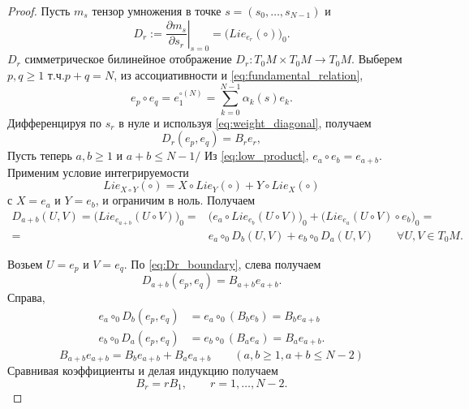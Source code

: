 \documentclass[a4paper, 10pt]{article}
\theoremstyle{plain}
\newcommand\Lie{Lie}
\begin{document}
	\begin{proof}
		Пусть $m_s$ тензор умножения в точке $s=(s_0,\ldots,s_{N-1})$ и
		\[D_r:=\left.\frac{\partial m_s}{\partial s_r}\right|_{s=0}=\bigl(\Lie_{e_r}(\circ)\bigr)_0.\]
		$D_r$ симметрическое билинейное отображение \(D_r:T_0M\times T_0M\longrightarrow T_0M.\)
		Выберем $p,q\ge 1$ т.ч.\(p+q=N\), из ассоциативности и \eqref{eq:fundamental_relation},
		\[e_p\circ e_q=e_1^{\circ(N)}
		=
		\sum_{k=0}^{N-1}\alpha_k(s)e_k.\]
		Дифференцируя по $s_r$ в нуле и используя  \eqref{eq:weight_diagonal}, получаем
		\begin{equation}
			D_r(e_p,e_q)=B_r e_r,
			\label{eq:Dr_boundary}
		\end{equation}
		Пусть теперь $a,b\ge1$ и $a+b\le N-1/$ Из \eqref{eq:low_product},
		\(e_a\circ e_b=e_{a+b}.\)
		Применим условие интегрируемости
		\[\Lie_{X\circ Y}(\circ)
		=
		X\circ\Lie_Y(\circ)+Y\circ\Lie_X(\circ)\]
		с $X=e_a$ и $Y=e_b$, и ограничим в ноль. Получаем
		\begin{equation}
			\begin{aligned}
				D_{a+b}(U,V) = \bigl(\Lie_{e_{a+b}}(U\circ V)\bigr)_0
				=&
				\bigl(e_a \circ \Lie_{e_b}(U\circ V)\bigr)_0 + \bigl(\Lie_{e_a}(U\circ V) \circ e_b\bigr)_0
				=\\=&
				e_a\circ_0D_b(U,V)
				+e_b\circ_0D_a(U,V)
				\label{eq:HM_linearized} 
				\qquad \forall U,V\in T_0M.
			\end{aligned}
		\end{equation}
		
		Возьем $U=e_p$ и $V=e_q$. По \eqref{eq:Dr_boundary}, слева получаем
		\[
		D_{a+b}(e_p,e_q)
		=B_{a+b}e_{a+b}.
		\]
		Справа,
		\begin{align*}
			e_a\circ_0D_b(e_p,e_q)
			&=e_a\circ_0(B_b e_b) = B_b e_{a+b} \\
			e_b\circ_0D_a(e_p,e_q)
			&=e_b\circ_0(B_a e_a) = B_a e_{a+b}.
		\end{align*}
		\[
		B_{a+b} e_{a+b} = B_be_{a+b}+B_ae_{a+b} \qquad (a,b \ge 1, a+b \le N-2)
		\]
		Сравнивая коэффициенты и делая индукцию получаем
		\[
		B_r=rB_1,\qquad r=1,\ldots,N-2.
		\]
	\end{proof}
\end{document}
